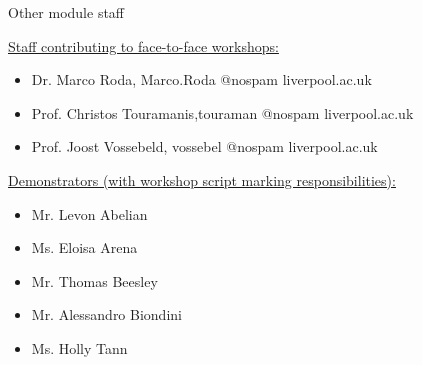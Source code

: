 \begin{frame}{Other module staff}

\underline{Staff contributing to face-to-face workshops:}\\
\vspace{0.2cm}
\begin{itemize}
  \item Dr. Marco Roda, Marco.Roda @nospam liverpool.ac.uk
  \item Prof. Christos Touramanis,touraman @nospam liverpool.ac.uk
  \item Prof. Joost Vossebeld, vossebel @nospam liverpool.ac.uk
\end{itemize}

\vspace{0.4cm}

\underline{Demonstrators (with workshop script marking responsibilities):}\\
\vspace{0.2cm}
\begin{itemize}
  \item Mr. Levon Abelian
  \item Ms. Eloisa Arena
  \item Mr. Thomas Beesley
  \item Mr. Alessandro Biondini
  \item Ms. Holly Tann
\end{itemize}

\end{frame}

